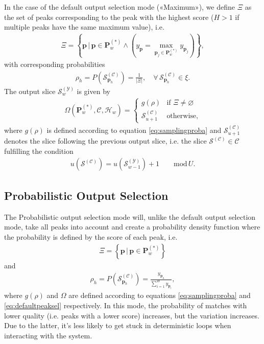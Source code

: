 In the case of the default output selection mode («Maximum»), we define $\Xi$ as the set of peaks corresponding to the peak with the highest score ($H>1$ if multiple peaks have the same maximum value), i.e.
	\begin{align}
		\Xi = \left\lbrace \bm p \,\bigg\vert	\, \bm p \in \bm P^{(\ast)}_w \wedge \left( y_{\bm p} = \max_{\bm p_j \in \bm P^{(\ast)}_w} y_{\bm p_j}\right)\right\rbrace,
	\end{align}
	with corresponding probabilities
	\begin{align}\label{eq:max-rho}
		\rho_h = P\left(\mathcal S^{(\mathcal C)}_{\bm p_h}\right) = \frac{1}{\left\lvert \Xi \right\rvert}, \quad \forall \,\mathcal S^{(\mathcal C)}_{\bm p_h} \in \xi.
	\end{align}
	The output slice $\mathcal S^{(\mathcal Y)}_w$ is given by
	\begin{align}\label{eq:defaultpeaksel}
		\Omega\left(\bm P^{(\ast)}_w, \mathcal C, \mathcal H_w\right)
		= \left\lbrace\begin{array}{ll}
			g(\rho) & \text{if } \Xi \ne \varnothing\\
			\mathcal S^{(\mathcal C)}_{u+1} & \text{otherwise},
		\end{array}\right.
	\end{align}
	where $g(\rho)$ is defined according to equation \ref{eq:samplingproba} and $\mathcal S^{(\mathcal C)}_{u+1}$ denotes the slice following the previous output slice, i.e. the slice $\mathcal S^{(\mathcal C)}\in \mathcal C$ fulfilling the condition
	\begin{align}\label{eq:defaultpeaksel-emptycase}
		u\left(\mathcal S^{(\mathcal C)}\right) = u\left(\mathcal S^{(\mathcal Y)}_{w-1}\right) + 1 \qquad \text{mod}\, U.
	\end{align}
	

\subsection{Probabilistic Output Selection}\label{ssec:proba-output-sel}
The Probabilistic output selection mode will, unlike the default output selection mode, take all peaks into account and create a probability density function where the probability is defined by the score of each peak, i.e.
	\begin{align}
		\Xi = \left\lbrace \bm p \, \bigg\vert \, \bm p \in \bm P^{(\ast)}_w\right\rbrace
	\end{align}
	and
	\begin{align}\label{eq:proba-rho}
		\rho_h = P\left(\mathcal S^{(\mathcal C)}_{\bm p_h}\right) = \frac{y_{\bm p_h}}{\sum_{i = 1}^H y_{\bm p_i}},
	\end{align}
	where $g(\rho)$ and $\Omega$ are defined according to equations \ref{eq:samplingproba} and \ref{eq:defaultpeaksel} respectively. In this mode, the probability of matches with lower quality (i.e. peaks with a lower score) increases, but the variation increases. Due to the latter, it's less likely to get stuck in deterministic loops when interacting with the system.

